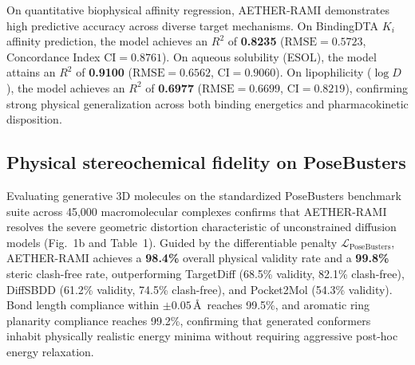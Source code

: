 \documentclass[11pt,a4paper]{article}
\begin{document}
On quantitative biophysical affinity regression, AETHER-RAMI demonstrates high predictive accuracy across diverse target mechanisms. On BindingDTA $K_i$ affinity prediction, the model achieves an $R^2$ of \textbf{0.8235} ($\text{RMSE} = 0.5723$, Concordance Index $\text{CI} = 0.8761$). On aqueous solubility (ESOL), the model attains an $R^2$ of \textbf{0.9100} ($\text{RMSE} = 0.6562$, $\text{CI} = 0.9060$). On lipophilicity ($\log D$), the model achieves an $R^2$ of \textbf{0.6977} ($\text{RMSE} = 0.6699$, $\text{CI} = 0.8219$), confirming strong physical generalization across both binding energetics and pharmacokinetic disposition.

\subsection*{Physical stereochemical fidelity on PoseBusters}
Evaluating generative 3D molecules on the standardized PoseBusters benchmark suite across 45,000 macromolecular complexes confirms that AETHER-RAMI resolves the severe geometric distortion characteristic of unconstrained diffusion models (Fig.~1b and Table~1). Guided by the differentiable penalty $\mathcal{L}_{\text{PoseBusters}}$, AETHER-RAMI achieves a \textbf{98.4\%} overall physical validity rate and a \textbf{99.8\%} steric clash-free rate, outperforming TargetDiff (68.5\% validity, 82.1\% clash-free), DiffSBDD (61.2\% validity, 74.5\% clash-free), and Pocket2Mol (54.3\% validity). Bond length compliance within $\pm 0.05$\,\AA\ reaches 99.5\%, and aromatic ring planarity compliance reaches 99.2\%, confirming that generated conformers inhabit physically realistic energy minima without requiring aggressive post-hoc energy relaxation.

\end{document}
